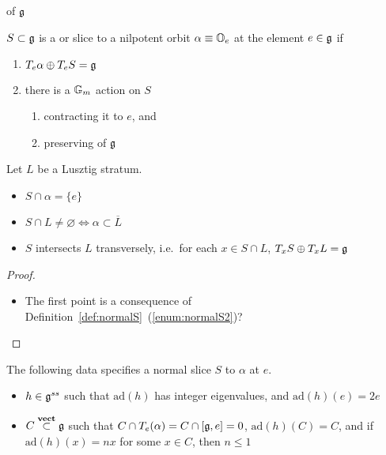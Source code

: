\documentclass[11pt]{amsart}
\newcommand{\ad}{\text{ad}}
\newcommand{\vect}{\text{\bf vect}}
\begin{document}
%
\begin{definition}
     of \(\mathfrak g\) 
\end{definition}
% 
\begin{definition}
    \label{def:normalS}
    \(S\subset\mathfrak g\) is a  or  slice to a nilpotent orbit \(\alpha \equiv \mathbb O_e\) at the element \(e\in \mathfrak g\) if 
    \begin{enumerate}
        \item \label{enum:normalS1} \(T_e\alpha\oplus T_e S = \mathfrak g\)
        \item \label{enum:normalS2} there is a \(\mathbb G_m\) action on \(S\) 
        \begin{enumerate}
            \item contracting it to \(e\), and
            \item preserving  of \(\mathfrak g\)
        \end{enumerate} 
    \end{enumerate}
\end{definition}
% 
\begin{lemma} Let \(L\) be a Lusztig stratum. 
    \begin{itemize}
        \item \(S\cap\alpha=\{e\}\)
        \item \(S\cap L\ne\varnothing \iff \alpha \subset \overline{L}\)
        \item \(S\) intersects \(L\) transversely, i.e.\ for each \(x\in S\cap L\), \(T_x S \oplus T_x L = \mathfrak g \)
    \end{itemize}
\end{lemma}
% 
\begin{proof}
    \begin{itemize}
        \item The first point is a consequence of Definition~\ref{def:normalS}~(\ref{enum:normalS2})? 
    \end{itemize}
\end{proof}
% 
\begin{lemma}
The following data specifies a normal slice \(S\) to \(\alpha\) at \(e\).
\begin{itemize}
    \item \(h\in\mathfrak g^{ss}\) such that \(\ad(h)\) has integer eigenvalues, and \(\ad(h)(e) = 2e\)
    \item \(C\overset{\vect}{\subset}\g\) such that \(C\cap T_e(\alpha) = C\cap [\mathfrak g,e] = 0 \), \(\ad(h)(C) = C\), and if \(\ad(h)(x) = nx\) for some \(x\in C\), then \(n\le 1\)
\end{itemize}
\end{lemma}
\end{document}
